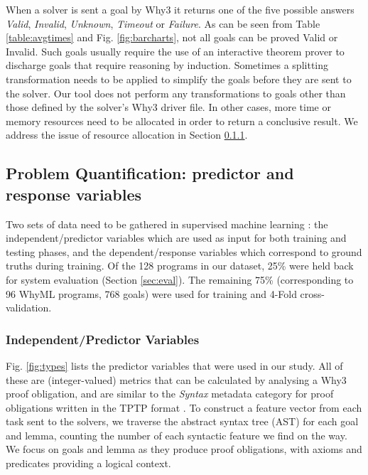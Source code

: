 \documentclass[runningheads,a4paper]{llncs}
\begin{document}
When a solver is sent a goal by \textsf{Why3} it returns one of the five possible answers \textit{Valid},  \textit{Invalid},  \textit{Unknown},  \textit{Timeout} or  \textit{Failure}. As can be seen from Table \ref{table:avgtimes} and Fig. \ref{fig:barcharts}, not all goals can be proved Valid or Invalid. Such goals usually require the use of an interactive theorem prover to discharge goals that require reasoning by induction. Sometimes a splitting transformation needs to be applied to simplify the goals before they are sent to the solver. Our tool does not perform any transformations to goals other than those defined by the solver's \textsf{Why3} driver file. In other cases, more time or memory resources need to be allocated in order to return a conclusive result. We address the issue of resource allocation in Section \ref{sec:independant}.     


\subsection{Problem Quantification: predictor and response variables}

Two sets of data need to be gathered in supervised machine learning \cite{Mitchell}: the independent/predictor variables which are used as input for both training and testing phases, and the dependent/response variables which correspond to ground truths during training. Of the 128 programs in our dataset, 25\% were held back for system evaluation (Section \ref{sec:eval}). The remaining 75\% (corresponding to 96 WhyML programs, 768 goals) were used for training and 4-Fold cross-validation.

\subsubsection{Independent/Predictor Variables}
\label{sec:independant}
Fig. \ref{fig:types} lists the predictor variables that were used in our study.  All of these are (integer-valued) metrics that can be calculated by analysing a \textsf{Why3} proof obligation, and are similar to the \textit{Syntax} metadata category for proof obligations written in the TPTP format \cite{TPTP}.
To construct a feature vector from each task sent to the solvers, we traverse the abstract syntax tree (AST) for each goal and lemma, counting the number of each syntactic feature we find on the way. We 
focus on goals and lemma as they produce proof obligations, with axioms and predicates providing a logical context.
\end{document}
